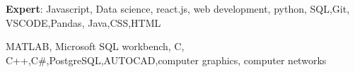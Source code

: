  \textbf{Expert}: Javascript, Data science, react.js, web development, python, SQL,Git, VSCODE,Pandas, Java,CSS,HTML

MATLAB, Microsoft SQL workbench, C, C++,C\#,PostgreSQL,AUTOCAD,computer graphics, computer networks

